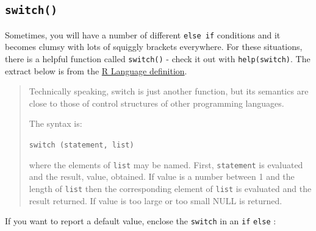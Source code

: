 \documentclass[titlepage]{book}\usepackage{knitr}
\begin{document}
\subsection{\texttt{switch()}}
Sometimes, you will have a number of different \texttt{else if} conditions and it becomes clumsy with lots of squiggly brackets everywhere.  For these situations, there is a helpful function called \texttt{switch()} - check it out with \texttt{help(switch)}. The extract below is from the \href{http://cran.r-project.org/doc/manuals/r-release/R-lang.html\#if}{R Language definition}.
\begin{quote}
Technically speaking, switch is just another function, but its semantics are close to those of control structures of other programming languages.

The syntax is:

\texttt{switch (statement, list)}

where the elements of \texttt{list} may be named. First, \texttt{statement} is evaluated and the result, value, obtained. If value is a number between 1 and the length of \texttt{list} then the corresponding element of \texttt{list} is evaluated and the result returned. If value is too large or too small NULL is returned.
\end{quote}
\begin{knitrout}
\color{fgcolor}\begin{kframe}
\begin{alltt}
 \hlkwb{<-} 
 \hlopt{+}\hlstd{,} \hlstd{(}\hlopt{:}\hlstd{),} \hlstd{(}\hlstd{))}
\hlstd{(}\hlstd{,} \hlopt{+}\hlstd{,} \hlstd{(}\hlopt{:}\hlstd{),} \hlstd{(}\hlstd{))}
\hlstd{(}\hlstd{,} \hlopt{+}\hlstd{,} \hlstd{(}\hlopt{:}\hlstd{),} \hlstd{(}\hlstd{))}
\end{alltt}
\end{kframe}
\end{knitrout}
If you want to report a default value, enclose the \texttt{switch} in an \texttt{if} \texttt{else} :
\end{document}
